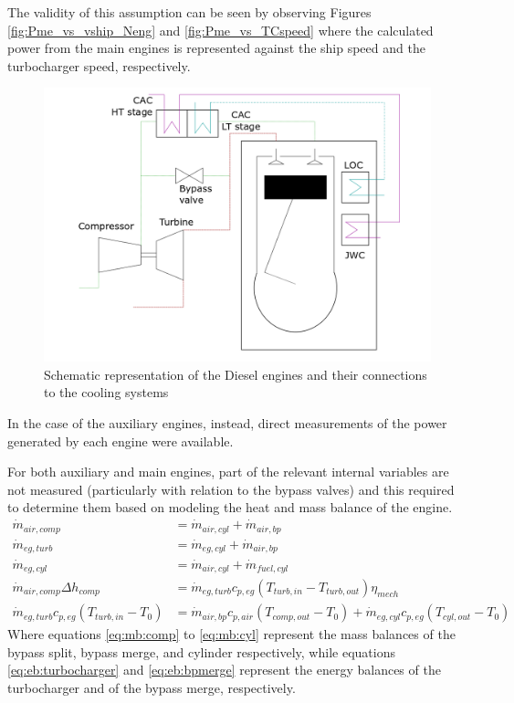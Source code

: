 \documentclass[preprint,12pt]{elsarticle}
\begin{document}
The validity of this assumption can be seen by observing Figures \ref{fig:Pme_vs_vship_Neng} and \ref{fig:Pme_vs_TCspeed} where the calculated  power from the main engines is represented against the ship speed and the turbocharger speed, respectively.

\begin{figure}
	\centering
	\includegraphics[width=0.9\linewidth]{Figures/DieselEngines}
	\caption{Schematic representation of the Diesel engines and their connections to the cooling systems}
	\label{fig:DieselEngines}
\end{figure}

In the case of the auxiliary engines, instead, direct measurements of the power generated by each engine were available. 

For both auxiliary and main engines, part of the relevant internal variables are not measured (particularly with relation to the bypass valves) and this required to determine them based on modeling the heat and mass balance of the engine. 
\begin{align}
	\dot{m}_{air,comp} & =  \dot{m}_{air,cyl} + \dot{m}_{air,bp} \label{eq:mb:comp} \\ 
	\dot{m}_{eg,turb} & = \dot{m}_{eg,cyl} + \dot{m}_{air,bp} \label{eq:mb:turb} \\
	\dot{m}_{eg,cyl} & = \dot{m}_{air,cyl} + \dot{m}_{fuel,cyl} \label{eq:mb:cyl} \\
	\dot{m}_{air,comp} \Delta h_{comp} & = \dot{m}_{eg,turb} c_{p,eg} (T_{turb,in} - T_{turb,out}) \eta_{mech} \label{eq:eb:turbocharger} \\
	\dot{m}_{eg,turb} c_{p,eg} (T_{turb,in} - T_0) & = \dot{m}_{air,bp} c_{p,air} (T_{comp,out} - T_0) + \dot{m}_{eg,cyl} c_{p,eg}  (T_{cyl,out} - T_0) \label{eq:eb:bpmerge}
\end{align}
Where equations \ref{eq:mb:comp} to \ref{eq:mb:cyl} represent the mass balances of the bypass split, bypass merge, and cylinder respectively, while equations \ref{eq:eb:turbocharger} and \ref{eq:eb:bpmerge} represent the energy balances of the turbocharger and of the bypass merge, respectively.
\end{document}
